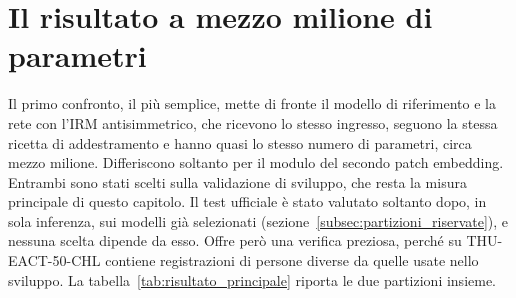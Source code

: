 
\section{Il risultato a mezzo milione di parametri}
\label{sec:risultati_irm}

Il primo confronto, il più semplice, mette di fronte il modello di riferimento e la rete con l'IRM antisimmetrico, che ricevono lo stesso ingresso, seguono la stessa ricetta di addestramento e hanno quasi lo stesso numero di parametri, circa mezzo milione. Differiscono soltanto per il modulo del secondo patch embedding. Entrambi sono stati scelti sulla validazione di sviluppo, che resta la misura principale di questo capitolo. Il test ufficiale è stato valutato soltanto dopo, in sola inferenza, sui modelli già selezionati (sezione~\ref{subsec:partizioni_riservate}), e nessuna scelta dipende da esso. Offre però una verifica preziosa, perché su THU-EACT-50-CHL contiene registrazioni di persone diverse da quelle usate nello sviluppo. La tabella~\ref{tab:risultato_principale} riporta le due partizioni insieme.

